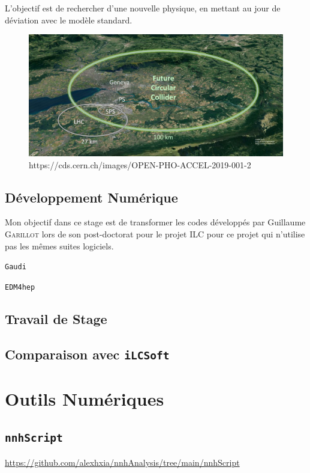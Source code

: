 \documentclass[10pt,a4paper]{report}
\begin{document}
L'objectif est de rechercher d'une nouvelle physique, en mettant au jour de 
déviation avec le modèle standard.


\begin{figure}[h!]
    \centering
    \includegraphics[width=\textwidth]{../img/FCC.jpg}
    \caption{https://cds.cern.ch/images/OPEN-PHO-ACCEL-2019-001-2}
    \label{fcc:img}
\end{figure}

\section{Développement Numérique}

Mon objectif dans ce stage est de transformer les codes développés par Guillaume 
\textsc{Garillot} lors de son post-doctorat pour le projet ILC pour ce projet 
qui n'utilise pas les mêmes suites logiciels.

\texttt{Gaudi}

\texttt{EDM4hep}

\section{Travail de Stage}

\section{Comparaison avec \texttt{iLCSoft}}


\chapter{Outils Numériques}

\section{\texttt{nnhScript}}
\url{https://github.com/alexhxia/nnhAnalysis/tree/main/nnhScript}
\end{document}
